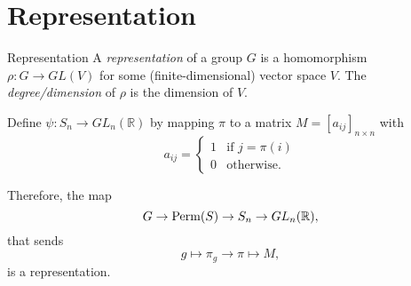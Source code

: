 
\section{Representation}

\begin{defn}{Representation}{}
  A \emph{representation} of a group \(G\) is a homomorphism \(\rho\colon G \to GL(V)\) for some (finite-dimensional) vector space \(V\). The \emph{degree/dimension} of \(\rho\) is the dimension of \(V\).
\end{defn}

\begin{prop}{}{}
  Define \(\psi\colon S_n \to GL_n(\mathbb{R})\) by mapping \(\pi\) to a matrix \(M = [a_{ij}]_{n \times n}\) with \[
    a_{ij} =
	\begin{cases}
	  1 & \text{if }j = \pi(i)\\
	  0 & \text{otherwise.}
	\end{cases}
  \] 

  Therefore, the map \[
    G \to \operatorname{Perm}(S) \to S_n \to GL_n(\mathbb{R}),
  \] that sends \[
    g \mapsto \pi_g \to \pi \mapsto M,
  \] 
  is a representation.
\end{prop}
